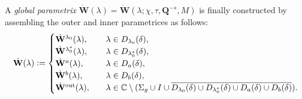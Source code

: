 A \emph{global parametrix} $\dot{\mathbf{W}}(\lambda)=\dot{\mathbf{W}}(\lambda;\chi,\tau,\mathbf{Q}^{-s},M)$ is finally constructed by assembling the outer and inner parametrices as follows:
\begin{equation}
\dot{\mathbf{W}}(\lambda)\vcentcolon= 
\begin{cases}
\dot{\mathbf{W}}^{\lambda_0} (\lambda),&\quad \lambda\in D_{\lambda_0}(\delta),\\
\dot{\mathbf{W}}^{\lambda_0^*} (\lambda),&\quad \lambda\in D_{\lambda_0^*}(\delta),\\
\dot{\mathbf{W}}^a (\lambda),&\quad \lambda\in D_a(\delta),\\
\dot{\mathbf{W}}^b (\lambda),&\quad \lambda\in D_b(\delta),\\
\dot{\mathbf{W}}^\mathrm{out} (\lambda),&\quad \lambda\in \mathbb{C}\setminus(\Sigma_g \cup I \cup \overline{D_{\lambda_0}(\delta)\cup D_{\lambda_0^*}(\delta) \cup D_a(\delta) \cup D_b(\delta)}).
\end{cases}
\label{eq:W-dot-bun}
\end{equation}

